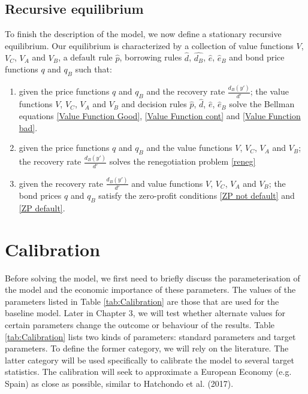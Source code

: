 \subsection{Recursive equilibrium}
To finish the description of the model, we now define a stationary recursive equilibrium. Our equilibrium is characterized by a collection of value functions $V$, $V_C$, $V_A$ and $V_B$, a default rule $\hat{p}$, borrowing rules $\hat{d}$, $\hat{d_B}$, $\hat{e}$, $\hat{e}_B$ and bond price functions $q$ and $q_B$ such that:
\begin{enumerate}
    \item given the price functions $q$ and $q_B$ and the recovery rate $\frac{d_B(y')}{d'}$; the value functions $V$, $V_C$, $V_A$ and $V_B$ and decision rules $\hat{p}$, $\hat{d}$, $\hat{e}$, $\hat{e}_B$ solve the Bellman equations \eqref{Value Function Good}, \eqref{Value Function cont} and \eqref{Value Function bad}.
    \item given the price functions $q$ and $q_B$ and the value functions $V$, $V_C$, $V_A$ and $V_B$; the recovery rate $\frac{d_B(y')}{d'}$ solves the renegotiation problem \eqref{reneg}
    \item given the recovery rate $\frac{d_B(y')}{d'}$ and value functions  $V$, $V_C$, $V_A$ and $V_B$; the bond prices $q$ and $q_B$ satisfy the zero-profit conditions \eqref{ZP not default} and \eqref{ZP default}.
\end{enumerate}

\section{Calibration}
Before solving the model, we first need to briefly discuss the parameterisation of the model and the economic importance of these parameters. The values of the parameters listed in Table \ref{tab:Calibration} are those that are used for the baseline model. Later in Chapter 3, we will test whether alternate values for certain parameters change the outcome or behaviour of the results. Table \ref{tab:Calibration} lists two kinds of parameters: standard parameters and target parameters. To define the former category, we will rely on the literature. The latter category will be used specifically to calibrate the model to several target statistics. The calibration will seek to approximate a European Economy (e.g. Spain) as close as possible, similar to Hatchondo et al. (2017).\\

